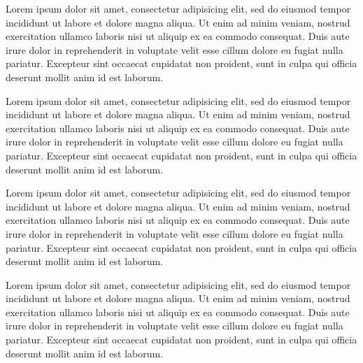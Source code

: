 \documentclass{book}
\begin{document}
\begin{pages}
\begin{Rightside}
\pstart
\begin{ledgroup}

Lorem ipsum dolor sit amet, consectetur adipisicing elit, sed do eiusmod tempor incididunt ut labore et dolore magna aliqua. Ut enim ad minim veniam, nostrud exercitation ullamco laboris nisi ut aliquip ex ea commodo consequat. Duis aute irure dolor in reprehenderit in voluptate velit esse cillum dolore eu fugiat nulla pariatur. Excepteur sint occaecat cupidatat non proident, sunt in culpa qui officia deserunt mollit anim id est laborum.
\end{ledgroup}
\pend


\pstart
\begin{ledgroup}

Lorem ipsum dolor sit amet, consectetur adipisicing elit, sed do eiusmod tempor incididunt ut labore et dolore magna aliqua. Ut enim ad minim veniam, nostrud exercitation ullamco laboris nisi ut aliquip ex ea commodo consequat. Duis aute irure dolor in reprehenderit in voluptate velit esse cillum dolore eu fugiat nulla pariatur. Excepteur sint occaecat cupidatat non proident, sunt in culpa qui officia deserunt mollit anim id est laborum.
\end{ledgroup}
\pend

\pstart
\begin{ledgroup}

Lorem ipsum dolor sit amet, consectetur adipisicing elit, sed do eiusmod tempor incididunt ut labore et dolore magna aliqua. Ut enim ad minim veniam, nostrud exercitation ullamco laboris nisi ut aliquip ex ea commodo consequat. Duis aute irure dolor in reprehenderit in voluptate velit esse cillum dolore eu fugiat nulla pariatur. Excepteur sint occaecat cupidatat non proident, sunt in culpa qui officia deserunt mollit anim id est laborum.
\end{ledgroup}
\pend

\pstart
\begin{ledgroup}

Lorem ipsum dolor sit amet, consectetur adipisicing elit, sed do eiusmod tempor incididunt ut labore et dolore magna aliqua. Ut enim ad minim veniam, nostrud exercitation ullamco laboris nisi ut aliquip ex ea commodo consequat. Duis aute irure dolor in reprehenderit in voluptate velit esse cillum dolore eu fugiat nulla pariatur. Excepteur sint occaecat cupidatat non proident, sunt in culpa qui officia deserunt mollit anim id est laborum.
\end{ledgroup}
\pend


\end{Rightside}
\end{pages}
\end{document}
